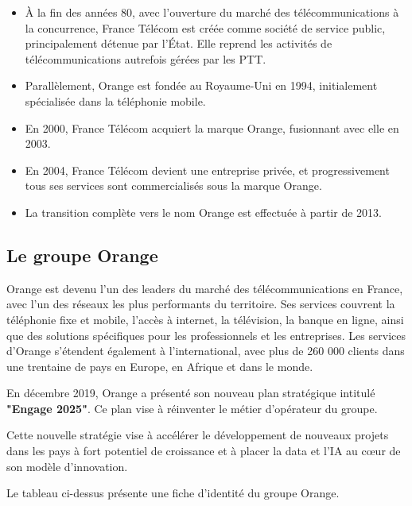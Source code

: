 \begin{itemize}
    \item À la fin des années 80, avec l'ouverture du marché des télécommunications à la concurrence, France Télécom est créée comme société de service public, principalement détenue par l'État. Elle reprend les activités de télécommunications autrefois gérées par les PTT.
    \item Parallèlement, Orange est fondée au Royaume-Uni en 1994, initialement spécialisée dans la téléphonie mobile.
    \item En 2000, France Télécom acquiert la marque Orange, fusionnant avec elle en 2003.
    \item En 2004, France Télécom devient une entreprise privée, et progressivement tous ses services sont commercialisés sous la marque Orange.
    \item La transition complète vers le nom Orange est effectuée à partir de 2013.
\end{itemize}

\subsection{Le groupe Orange}

Orange est devenu l'un des leaders du marché des télécommunications en France, avec l'un des réseaux les plus performants du territoire. Ses services couvrent la téléphonie fixe et mobile, l'accès à internet, la télévision, la banque en ligne, ainsi que des solutions spécifiques pour les professionnels et les entreprises.
Les services d'Orange s'étendent également à l'international, avec plus de 260 000 clients dans une trentaine de pays en Europe, en Afrique et dans le monde.

En décembre 2019, Orange a présenté son nouveau plan stratégique intitulé \textbf{"Engage 2025"}. Ce plan vise à
réinventer le métier d’opérateur du groupe. 

\noindent Cette nouvelle stratégie vise à accélérer le développement de
nouveaux projets dans les pays à fort potentiel de croissance et à placer la data et l’IA au cœur de son modèle
d’innovation.

\medskip

Le tableau ci-dessus présente une fiche d’identité du groupe Orange.

